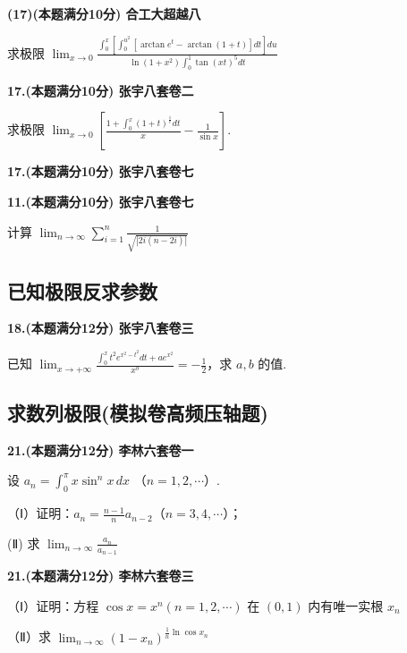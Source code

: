 \documentclass[a4paper,12pt]{article}
\begin{document}
\vspace{0.5cm}

\textbf{(17)(本题满分10分) 合工大超越八}

求极限 $\lim_{x\to0}\frac{\int_{0}^{x}\left[\int_{0}^{u^{2}}\left[\arctan e^{t}-\arctan(1+t)\right]dt\right]du}{\ln(1+x^{2})\int_{0}^{1}\tan(xt)^{5}dt}$

\vspace{0.5cm}

\textbf{17.(本题满分10分) 张宇八套卷二}

求极限 $\lim_{x\to0}\left[\frac{1+\int_{0}^{x}(1+t)^{\frac{1}{t}}dt}{x}-\frac{1}{\sin x}\right]$.

\vspace{0.5cm}

\textbf{17.(本题满分10分) 张宇八套卷七}

\textbf{11.(本题满分10分) 张宇八套卷七}

计算 $\lim_{n\to\infty}\sum_{i=1}^{n}\frac{1}{\sqrt{\left|2i\left(n-2i\right)\right|}}$

\subsection{已知极限反求参数}

\textbf{18.(本题满分12分) 张宇八套卷三}

已知 $\lim_{x\to+\infty}\frac{\int_{0}^{x}t^{2}e^{x^{2}-t^{2}}dt+ae^{x^{2}}}{x^{b}}=-\frac{1}{2}$，求 $a,b$ 的值.

\subsection{求数列极限(模拟卷高频压轴题)}

\textbf{21.(本题满分12分) 李林六套卷一}

设 $a_{n}=\int_{0}^{\pi}x\sin^{n}x\,dx$ （$n=1,2,\cdots$）.

（Ⅰ）证明：$a_{n}=\frac{n-1}{n}a_{n-2}$（$n=3,4,\cdots$）；

(Ⅱ) 求 $\lim_{n\to\infty}\frac{a_n}{a_{n-1}}$

\vspace{0.5cm}

\textbf{21.(本题满分12分) 李林六套卷三}

（Ⅰ）证明：方程 $\cos x = x^{n} (n = 1, 2, \cdots)$ 在 $(0, 1)$ 内有唯一实根 $x_{n}$

（Ⅱ）求 $\lim_{n\to\infty}(1-x_n)^{\frac{1}{n}\ln\cos x_n}$

\vspace{0.5cm}
\end{document}
